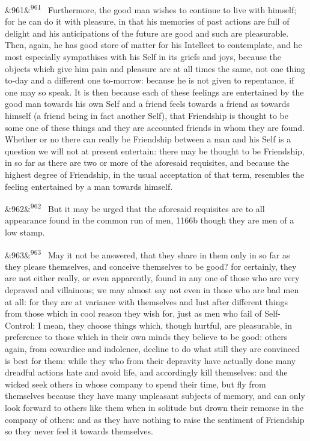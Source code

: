\documentclass[12pt]{article}
\newcommand{\para}[1][]{\par\noindent\ifx&#1&\else\textsuperscript{\footnotesize #1}~\fi}
\begin{document}
\para[961] Furthermore, the good man wishes to continue to live with himself; for he can do it with pleasure, in that his memories of past actions are full of delight and his anticipations of the future are good and such are pleasurable. Then, again, he has good store of matter for his Intellect to contemplate, and he most especially sympathises with his Self in its griefs and joys, because the objects which give him pain and pleasure are at all times the same, not one thing to-day and a different one to-morrow: because he is not given to repentance, if one may so speak. It is then because each of these feelings are entertained by the good man towards his own Self and a friend feels towards a friend as towards himself (a friend being in fact another Self), that Friendship is thought to be some one of these things and they are accounted friends in whom they are found. Whether or no there can really be Friendship between a man and his Self is a question we will not at present entertain: there may be thought to be Friendship, in so far as there are two or more of the aforesaid requisites, and because the highest degree of Friendship, in the usual acceptation of that term, resembles the feeling entertained by a man towards himself.

\para[962] But it may be urged that the aforesaid requisites are to all appearance found in the common run of men, 1166b though they are men of a low stamp.

\para[963] May it not be answered, that they share in them only in so far as they please themselves, and conceive themselves to be good? for certainly, they are not either really, or even apparently, found in any one of those who are very depraved and villainous; we may almost say not even in those who are bad men at all: for they are at variance with themselves and lust after different things from those which in cool reason they wish for, just as men who fail of Self-Control: I mean, they choose things which, though hurtful, are pleasurable, in preference to those which in their own minds they believe to be good: others again, from cowardice and indolence, decline to do what still they are convinced is best for them: while they who from their depravity have actually done many dreadful actions hate and avoid life, and accordingly kill themselves: and the wicked seek others in whose company to spend their time, but fly from themselves because they have many unpleasant subjects of memory, and can only look forward to others like them when in solitude but drown their remorse in the company of others: and as they have nothing to raise the sentiment of Friendship so they never feel it towards themselves.
\end{document}
